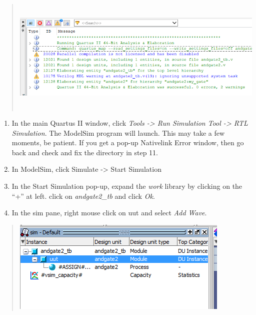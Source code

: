 \documentclass[
]{article}
\begin{document}
\begin{quote}
\includegraphics[width=6.50278in,height=2.18194in]{vertopal_3cb071cd52e44dfb8dc5befe7ee47074/media/image2.png}
\end{quote}

\begin{enumerate}
\def\labelenumi{\arabic{enumi}.}
\setcounter{enumi}{17}
\item
  In the main Quartus II window, click \emph{Tools -\textgreater{} Run
  Simulation Tool -\textgreater{} RTL Simulation}. The ModelSim program
  will launch. This may take a few moments, be patient. If you get a
  pop-up Nativelink Error window, then go back and check and fix the
  directory in step 11.
\item
  In ModelSim, click Simulate -\textgreater{} Start Simulation
\item
  In the Start Simulation pop-up, expand the \emph{work} library by
  clicking on the ``+'' at left. click on \emph{andgate2\_tb} and click
  \emph{Ok}.
\item
  In the sim pane, right mouse click on uut and select \emph{Add Wave}.
\end{enumerate}

\begin{quote}
\includegraphics[width=4.10417in,height=1.75in]{vertopal_3cb071cd52e44dfb8dc5befe7ee47074/media/image3.png}
\end{quote}
\end{document}
